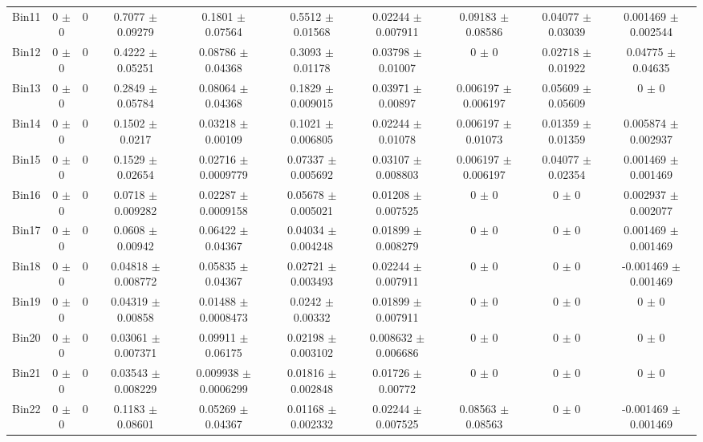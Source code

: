 \begin{tabular}{@{\extracolsep{4pt}}lccccccccc@{}}
     Bin11 & 0 $\pm$ 0 & 0 & 0.7077 $\pm$ 0.09279 & 0.1801 $\pm$ 0.07564 & 0.5512 $\pm$ 0.01568 & 0.02244 $\pm$ 0.007911 & 0.09183 $\pm$ 0.08586 & 0.04077 $\pm$ 0.03039 & 0.001469 $\pm$ 0.002544 \\ 
     Bin12 & 0 $\pm$ 0 & 0 & 0.4222 $\pm$ 0.05251 & 0.08786 $\pm$ 0.04368 & 0.3093 $\pm$ 0.01178 & 0.03798 $\pm$ 0.01007 & 0 $\pm$ 0 & 0.02718 $\pm$ 0.01922 & 0.04775 $\pm$ 0.04635 \\ 
     Bin13 & 0 $\pm$ 0 & 0 & 0.2849 $\pm$ 0.05784 & 0.08064 $\pm$ 0.04368 & 0.1829 $\pm$ 0.009015 & 0.03971 $\pm$ 0.00897 & 0.006197 $\pm$ 0.006197 & 0.05609 $\pm$ 0.05609 & 0 $\pm$ 0 \\ 
     Bin14 & 0 $\pm$ 0 & 0 & 0.1502 $\pm$ 0.0217 & 0.03218 $\pm$ 0.00109 & 0.1021 $\pm$ 0.006805 & 0.02244 $\pm$ 0.01078 & 0.006197 $\pm$ 0.01073 & 0.01359 $\pm$ 0.01359 & 0.005874 $\pm$ 0.002937 \\ 
     Bin15 & 0 $\pm$ 0 & 0 & 0.1529 $\pm$ 0.02654 & 0.02716 $\pm$ 0.0009779 & 0.07337 $\pm$ 0.005692 & 0.03107 $\pm$ 0.008803 & 0.006197 $\pm$ 0.006197 & 0.04077 $\pm$ 0.02354 & 0.001469 $\pm$ 0.001469 \\ 
     Bin16 & 0 $\pm$ 0 & 0 & 0.0718 $\pm$ 0.009282 & 0.02287 $\pm$ 0.0009158 & 0.05678 $\pm$ 0.005021 & 0.01208 $\pm$ 0.007525 & 0 $\pm$ 0 & 0 $\pm$ 0 & 0.002937 $\pm$ 0.002077 \\ 
     Bin17 & 0 $\pm$ 0 & 0 & 0.0608 $\pm$ 0.00942 & 0.06422 $\pm$ 0.04367 & 0.04034 $\pm$ 0.004248 & 0.01899 $\pm$ 0.008279 & 0 $\pm$ 0 & 0 $\pm$ 0 & 0.001469 $\pm$ 0.001469 \\ 
     Bin18 & 0 $\pm$ 0 & 0 & 0.04818 $\pm$ 0.008772 & 0.05835 $\pm$ 0.04367 & 0.02721 $\pm$ 0.003493 & 0.02244 $\pm$ 0.007911 & 0 $\pm$ 0 & 0 $\pm$ 0 & -0.001469 $\pm$ 0.001469 \\ 
     Bin19 & 0 $\pm$ 0 & 0 & 0.04319 $\pm$ 0.00858 & 0.01488 $\pm$ 0.0008473 & 0.0242 $\pm$ 0.00332 & 0.01899 $\pm$ 0.007911 & 0 $\pm$ 0 & 0 $\pm$ 0 & 0 $\pm$ 0 \\ 
     Bin20 & 0 $\pm$ 0 & 0 & 0.03061 $\pm$ 0.007371 & 0.09911 $\pm$ 0.06175 & 0.02198 $\pm$ 0.003102 & 0.008632 $\pm$ 0.006686 & 0 $\pm$ 0 & 0 $\pm$ 0 & 0 $\pm$ 0 \\ 
     Bin21 & 0 $\pm$ 0 & 0 & 0.03543 $\pm$ 0.008229 & 0.009938 $\pm$ 0.0006299 & 0.01816 $\pm$ 0.002848 & 0.01726 $\pm$ 0.00772 & 0 $\pm$ 0 & 0 $\pm$ 0 & 0 $\pm$ 0 \\ 
     Bin22 & 0 $\pm$ 0 & 0 & 0.1183 $\pm$ 0.08601 & 0.05269 $\pm$ 0.04367 & 0.01168 $\pm$ 0.002332 & 0.02244 $\pm$ 0.007525 & 0.08563 $\pm$ 0.08563 & 0 $\pm$ 0 & -0.001469 $\pm$ 0.001469 \\ 

\end{tabular}
